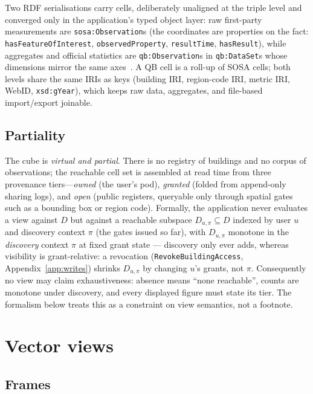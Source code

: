 \documentclass[11pt,a4paper]{article}
\theoremstyle{remark}
\begin{document}
Two RDF serialisations carry cells, deliberately unaligned at the triple level and
converged only in the application's typed object layer: raw first-party measurements
are \texttt{sosa:Observation}s (the coordinates are properties on the fact:
\texttt{hasFeatureOfInterest}, \texttt{observedProperty}, \texttt{resultTime},
\texttt{hasResult}), while aggregates and official statistics are
\texttt{qb:Observation}s in \texttt{qb:DataSet}s whose dimensions mirror the same
axes~\cite{qb,qb4st}. A QB cell is a roll-up of SOSA cells; both levels share the
same IRIs as keys (building IRI, region-code IRI, metric IRI, WebID,
\texttt{xsd:gYear}), which keeps raw data, aggregates, and file-based import/export
joinable.

\subsection{Partiality}\label{sec:partiality}

The cube is \emph{virtual and partial}. There is no registry of buildings and no
corpus of observations; the reachable cell set is assembled at read time from three
provenance tiers---\emph{owned} (the user's pod), \emph{granted} (folded from
append-only sharing logs), and \emph{open} (public registers, queryable only through
spatial gates such as a bounding box or region code). Formally, the application
never evaluates a view against $D$ but against a reachable subspace
$D_{u,\pi} \subseteq D$ indexed by user $u$ and discovery context $\pi$ (the gates
issued so far), with $D_{u,\pi}$ monotone in the \emph{discovery} context $\pi$
at fixed grant state --- discovery only ever adds, whereas visibility is
grant-relative: a revocation (\texttt{RevokeBuildingAccess},
Appendix~\ref{app:writes}) shrinks $D_{u,\pi}$ by changing $u$'s grants, not
$\pi$. Consequently no view may claim
exhaustiveness: absence means ``none reachable'', counts are monotone under
discovery, and every displayed figure must state its tier. The formalism below
treats this as a constraint on view semantics, not a footnote.

\section{Vector views}\label{sec:frames}

\subsection{Frames}
\end{document}
